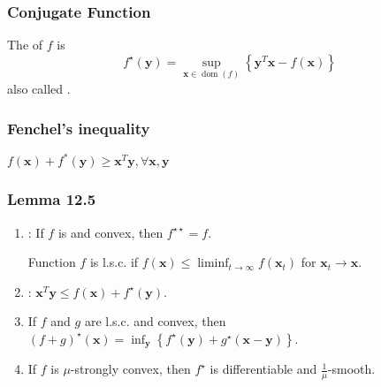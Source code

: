 \subsubsection*{Conjugate Function}
The  of $f$ is
$$
f^{\star}(\mathbf{y})=\sup _{\mathbf{x} \in \operatorname{dom}(f)}\left\{\mathbf{y}^{T} \mathbf{x}-f(\mathbf{x})\right\}
$$
also called .




\subsubsection*{Fenchel's inequality}
$f(\mathbf{x})+f^{*}(\mathbf{y}) \geq \mathbf{x}^{T} \mathbf{y}, \forall \mathbf{x}, \mathbf{y}$

\subsubsection*{Lemma 12.5}
\begin{enumerate}[label = (\arabic*), leftmargin=*]
    \item {}: If $f$ is  and convex, then $f^{\star \star}=f$.
    
    Function $f$ is l.s.c. if $f(\mathbf{x}) \leq \liminf _{t \rightarrow \infty} f\left(\mathbf{x}_{t}\right)$ for $\mathbf{x}_{t} \rightarrow \mathbf{x}$.
    
    \item {}: $\mathbf{x}^{T} \mathbf{y} \leq f(\mathbf{x})+f^{\star}(\mathbf{y})$.
    \item If $f$ and $g$ are l.s.c. and convex, then $(f+g)^{\star}(\mathbf{x})=\inf _{\mathbf{y}}\left\{f^{\star}(\mathbf{y})+g^{\star}(\mathbf{x}-\mathbf{y})\right\}$.
    \item If $f$ is $\mu$-strongly convex, then $f^{\star}$ is differentiable and $\frac{1}{\mu}$-smooth.
\end{enumerate}



